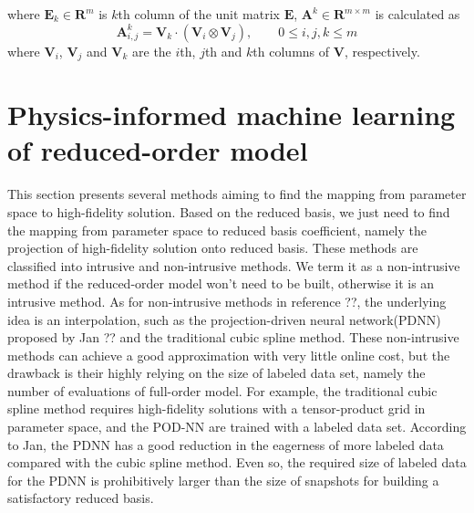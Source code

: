 \documentclass[preprint, 10pt]{elsarticle}
\begin{document}
where $\mathbf{E}_k \in \mathbf{R}^{m}$ is $k$th column of the unit matrix $\mathbf{E}$, $\mathbf{A}^k \in \mathbf{R}^{m \times m}$ is calculated as
\begin{equation}
\mathbf{A}_{i,j}^k = \mathbf{V}_k \cdot \left( \mathbf{V}_i \otimes \mathbf{V}_j \right), \qquad 0 \le i,j,k \le m
\end{equation}
where $\mathbf{V}_i$, $\mathbf{V}_j$ and $\mathbf{V}_k$ are the $i$th, $j$th and $k$th columns of $\mathbf{V}$, respectively.

\section{Physics-informed machine learning of reduced-order model}
This section presents several methods aiming to find the mapping from parameter space to high-fidelity solution. Based on the reduced basis, we just need to find the mapping from parameter space to reduced basis coefficient, namely the projection of high-fidelity solution onto reduced basis.
These methods are classified into intrusive and non-intrusive methods. We term it as a non-intrusive method if the reduced-order model won't need to be built, otherwise it is an intrusive method.
As for non-intrusive methods in reference ??, the underlying idea is an interpolation, such as the projection-driven neural network(PDNN) proposed by Jan ?? and the traditional cubic spline method. These non-intrusive methods can achieve a good approximation with very little online cost, but the drawback is their highly relying on the size of labeled data set, namely the number of evaluations of full-order model.
For example, the traditional cubic spline method requires high-fidelity solutions with a tensor-product grid in parameter space, and the POD-NN are trained with a labeled data set.
According to Jan, the PDNN has a good reduction in the eagerness of more labeled data compared with the cubic spline method.
Even so, the required size of labeled data for the PDNN is prohibitively larger than the size of snapshots for building a satisfactory reduced basis.
\end{document}
